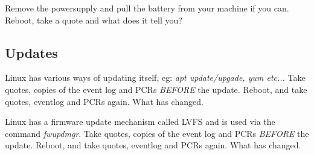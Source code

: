 \documentclass[11pt,a4paper]{article}
\begin{document}
Remove the powersupply and pull the battery from your machine if you can. Reboot, take a quote and what does it tell you?

\subsection{Updates}
Linux has various ways of updating itself, eg: \textit{apt update/upgade, yum etc...} Take quotes, copies of the event log and PCRs \textit{BEFORE} the update. Reboot, and take quotes, eventlog and PCRs again.  What has changed.

Linux has a firmware update mechanism called LVFS and is used via the command \textit{fwupdmgr}. Take quotes, copies of the event log and PCRs \textit{BEFORE} the update. Reboot, and take quotes, eventlog and PCRs again.  What has changed.
\end{document}
